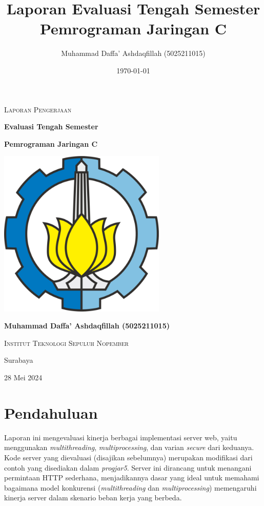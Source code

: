 \documentclass[12pt]{article}
\title{Laporan Evaluasi Tengah Semester\\Pemrograman Jaringan C}
\author{Muhammad Daffa' Ashdaqfillah (5025211015)}
\date{\today}
\begin{document}
\begin{titlepage}
    \centering
    {\scshape\Large Laporan Pengerjaan\par}
    \vspace{0.4cm}
    {\huge\bfseries Evaluasi Tengah Semester\par}
    \vspace{0.1cm}
    {\large\bfseries Pemrograman Jaringan C\par}
    \vspace{1cm}
    \vspace{1.5cm}
    \includegraphics[width=0.6\textwidth]{img/logo_its.png}\par\vspace{1cm}
    \vspace{1cm}
    \vspace{1.5cm}
    {\large\bfseries Muhammad Daffa' Ashdaqfillah (5025211015)\par}
    {\scshape\LARGE Institut Teknologi Sepuluh Nopember \par}
    \vfill
    {\large Surabaya\par}
    {\large 28 Mei 2024\par}
    \end{titlepage}
\newpage

\setcounter{page}{2} %

\tableofcontents
\newpage

\section{Pendahuluan}

Laporan ini mengevaluasi kinerja berbagai implementasi server web, yaitu menggunakan \textit{multithreading}, \textit{multiprocessing}, dan varian \textit{secure} dari keduanya. Kode server yang dievaluasi (disajikan sebelumnya) merupakan modifikasi dari contoh yang disediakan dalam \textit{progjar5}. Server ini dirancang untuk menangani permintaan HTTP sederhana, menjadikannya dasar yang ideal untuk memahami bagaimana model konkurensi (\textit{multithreading} dan \textit{multiprocessing}) memengaruhi kinerja server dalam skenario beban kerja yang berbeda.
\end{document}
